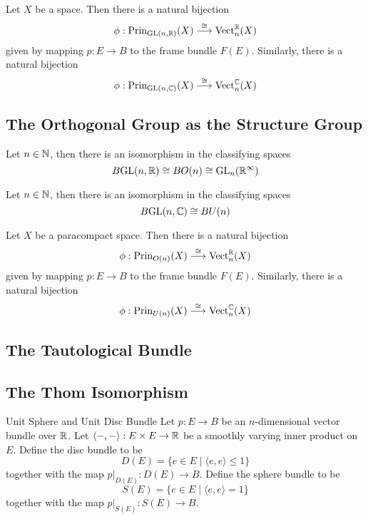 \documentclass[a4paper]{article}
\begin{document}
\begin{thm}{}{} Let $X$ be a space. Then there is a natural bijection $$\phi:\text{Prin}_{\text{GL}(n,\mathbb{R})}(X)\overset{\cong}{\longrightarrow}\text{Vect}_n^{\mathbb{R}}(X)$$ given by mapping $p:E\to B$ to the frame bundle $F(E)$. Similarly, there is a natural bijection $$\phi:\text{Prin}_{\text{GL}(n,\mathbb{C})}(X)\overset{\cong}{\longrightarrow}\text{Vect}_n^{\mathbb{C}}(X)$$
\end{thm}

\subsection{The Orthogonal Group as the Structure Group}
\begin{thm}{}{} Let $n\in\mathbb{N}$, then there is an isomorphism in the classifying spaces $$B\text{GL}(n,\mathbb{R})\cong BO(n)\cong\text{GL}_n(\mathbb{R}^\infty)$$
\end{thm}

\begin{thm}{}{} Let $n\in\mathbb{N}$, then there is an isomorphism in the classifying spaces $$B\text{GL}(n,\mathbb{C})\cong BU(n)$$
\end{thm}

\begin{thm}{}{} Let $X$ be a paracompact space. Then there is a natural bijection $$\phi:\text{Prin}_{O(n)}(X)\overset{\cong}{\longrightarrow}\text{Vect}_n^{\mathbb{R}}(X)$$ given by mapping $p:E\to B$ to the frame bundle $F(E)$. Similarly, there is a natural bijection $$\phi:\text{Prin}_{U(n)}(X)\overset{\cong}{\longrightarrow}\text{Vect}_n^{\mathbb{C}}(X)$$
\end{thm}


\subsection{The Tautological Bundle}

\subsection{The Thom Isomorphism}
\begin{defn}{Unit Sphere and Unit Disc Bundle}{} Let $p:E\to B$ be an $n$-dimensional vector bundle over $\mathbb{R}$. Let $\langle-,-\rangle:E\times E\to\mathbb{R}$ be a smoothly varying inner product on $E$. Define the disc bundle to be $$D(E)=\{e\in E\;|\;\langle e,e\rangle\leq 1\}$$ together with the map $p|_{D(E)}:D(E)\to B$. Define the sphere bundle to be $$S(E)=\{e\in E\;|\;\langle e,e\rangle=1\}$$ together with the map $p|_{S(E)}:S(E)\to B$. 
\end{defn}
\end{document}
